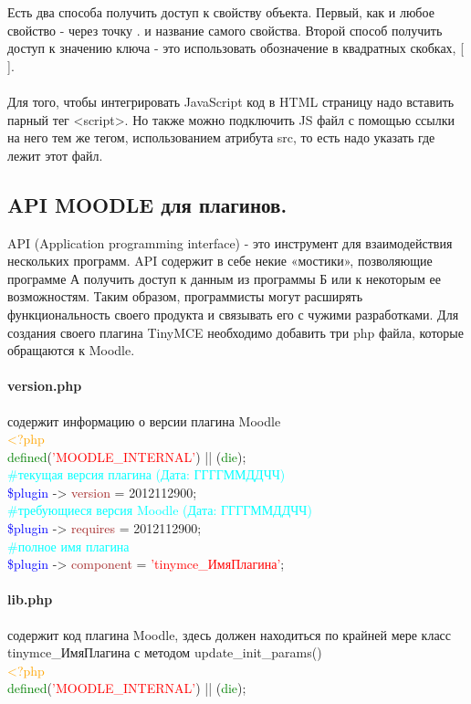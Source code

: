 \documentclass[14pt,Diplom]{diplomwork}
\begin{document}
Есть два способа получить доступ к свойству объекта. Первый, как и любое свойство - через точку . и название самого свойства. Второй способ получить доступ к значению ключа - это использовать обозначение в квадратных скобках, [ ].


\paragraph{}
Для того, чтобы интегрировать JavaScript код в HTML страницу надо вставить парный тег <script>. Но также можно подключить JS файл с помощью ссылки на него тем же тегом, использованием атрибута src, то есть надо указать где лежит этот файл.


\subsection{API MOODLE для плагинов.}
API (Application programming interface) - это инструмент для взаимодействия нескольких программ. API содержит в себе некие «мостики», позволяющие программе А получить доступ к данным из программы Б или к некоторым ее возможностям. Таким образом, программисты могут расширять функциональность своего продукта и связывать его с чужими разработками. Для создания своего плагина TinyMCE необходимо добавить три php файла, которые обращаются к Moodle.

 \paragraph{version.php}
содержит информацию о версии плагина Moodle\\
\textcolor{orange}{<?php} \\
\textcolor{green}{defined}(\textcolor{red}{'MOODLE\_INTERNAL'}) || (\textcolor{green}{die});\\
\textcolor{cyan}{\#текущая версия плагина (Дата: ГГГГММДДЧЧ)}\\
\textcolor{blue}{\$plugin} -> \textcolor{brown}{version} = 2012112900; \\
\textcolor{cyan}{\#требующиеся версия Moodle (Дата: ГГГГММДДЧЧ)}\\
\textcolor{blue}{\$plugin} -> \textcolor{brown}{requires} = 2012112900; \\
\textcolor{cyan}{\#полное имя плагина}\\
\textcolor{blue}{\$plugin} -> \textcolor{brown}{component} = \textcolor{red}{'tinymce\_ИмяПлагина'}; \\

\paragraph{lib.php}
содержит код плагина Moodle, здесь должен находиться по крайней мере класс tinymce\_ИмяПлагина с методом update\_init\_params()\\
\textcolor{orange}{<?php} \\
\textcolor{green}{defined}(\textcolor{red}{'MOODLE\_INTERNAL'}) || (\textcolor{green}{die});\\
\end{document}
